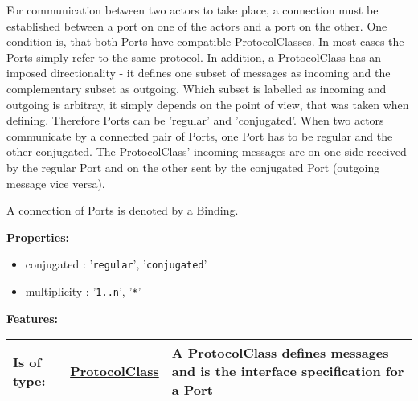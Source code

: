 	For communication between two actors to take place, a connection must be established between a port on one of the actors and a port on the other.
	One condition is, that both Ports have compatible ProtocolClasses. In most cases the Ports simply refer to the same protocol.
	In addition, a ProtocolClass has an imposed directionality - it defines one subset of messages as incoming and the complementary subset as outgoing.
	Which subset is labelled as incoming and outgoing is arbitray, it simply depends on the point of view, that was taken when defining.
	Therefore Ports can be 'regular' and 'conjugated'. When two actors communicate by a connected pair of Ports, one Port has to be regular and the other conjugated.
	The ProtocolClass' incoming messages are on one side received by the regular Port and on the other sent by the conjugated Port (outgoing message vice versa).
	
	A connection of Ports is denoted by a Binding. 
		
	\textbf{Properties:}
	\begin{itemize}
	\item conjugated : '\verb|regular|', '\verb|conjugated|'
	\item multiplicity : '\verb|1..n|', '\verb|*|'
	\end{itemize}
		
	\begingroup
	\textbf{Features:}
	\renewcommand{\arraystretch}{1.8} %
	\begin{longtable}{l|l p{}}
		\hline
	Is of type: & \tabitem \hyperlink{ref:ProtocolClass}{ProtocolClass}  & A ProtocolClass defines messages and is the interface specification for a Port\\
	\hline
	\end{longtable}
	\endgroup
		
